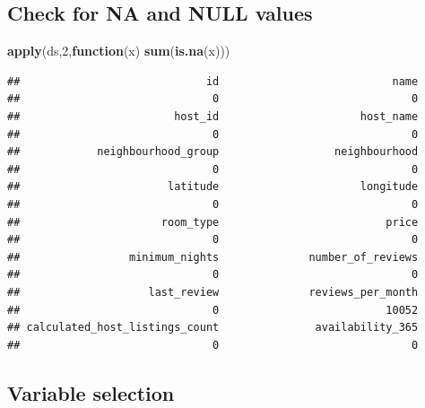 \documentclass[
]{article}
\newenvironment{Shaded}{\begin{snugshade}}{\end{snugshade}}
\newcommand{\ControlFlowTok}[1]{\textcolor[rgb]{0.13,0.29,0.53}{\textbf{#1}}}
\newcommand{\DecValTok}[1]{\textcolor[rgb]{0.00,0.00,0.81}{#1}}
\newcommand{\KeywordTok}[1]{\textcolor[rgb]{0.13,0.29,0.53}{\textbf{#1}}}
\newcommand{\NormalTok}[1]{#1}
\newcommand{\OperatorTok}[1]{\textcolor[rgb]{0.81,0.36,0.00}{\textbf{#1}}}
\newcommand{\StringTok}[1]{\textcolor[rgb]{0.31,0.60,0.02}{#1}}
\begin{document}
\hypertarget{check-for-na-and-null-values}{%
\subsection{Check for NA and NULL
values}\label{check-for-na-and-null-values}}

\begin{Shaded}
\begin{Highlighting}[]
\KeywordTok{apply}\NormalTok{(ds,}\DecValTok{2}\NormalTok{,}\ControlFlowTok{function}\NormalTok{(x) }\KeywordTok{sum}\NormalTok{(}\KeywordTok{is.na}\NormalTok{(x)))}
\end{Highlighting}
\end{Shaded}

\begin{verbatim}
##                             id                           name 
##                              0                              0 
##                        host_id                      host_name 
##                              0                              0 
##            neighbourhood_group                  neighbourhood 
##                              0                              0 
##                       latitude                      longitude 
##                              0                              0 
##                      room_type                          price 
##                              0                              0 
##                 minimum_nights              number_of_reviews 
##                              0                              0 
##                    last_review              reviews_per_month 
##                              0                          10052 
## calculated_host_listings_count               availability_365 
##                              0                              0
\end{verbatim}

\hypertarget{variable-selection}{%
\subsection{Variable selection}\label{variable-selection}}

\begin{Shaded}
\end{Shaded}
\end{document}
